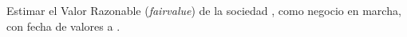 Estimar el Valor Razonable (\textit{\gls{fairvalue}}) de la sociedad \negocioEnMarcha, como negocio en marcha, con fecha de valores a \fechaValores.
